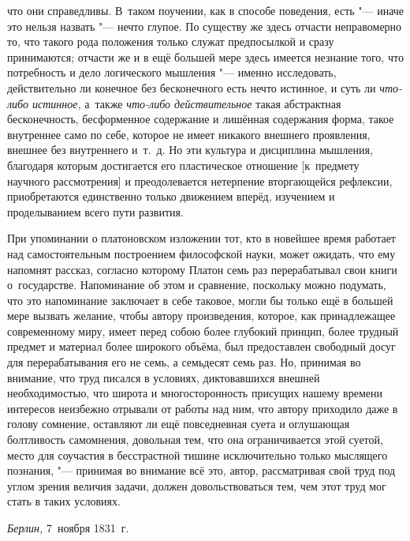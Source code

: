 что они справедливы. В~таком поучении, как в способе поведения, есть
"--- иначе это нельзя назвать "--- нечто глупое. По существу же здесь
отчасти неправомерно то, что такого рода положения только служат предпосылкой
и сразу принимаются; отчасти же и в ещё большей мере здесь имеется
незнание того, что потребность и дело логического мышления "--- именно
исследовать, действительно ли конечное без бесконечного есть нечто
истинное, и суть ли {\em что-либо истинное,} а~также
{\em что-либо действительное} такая абстрактная бесконечность, бесформенное
содержание и лишённая содержания форма, такое внутреннее само по себе, которое не
имеет никакого внешнего проявления, внешнее без внутреннего и~т.~д. Но эти культура и дисциплина
мышления, благодаря которым достигается его пластическое отношение [к~предмету
научного рассмотрения] и преодолевается нетерпение вторгающейся рефлексии,
приобретаются единственно только движением вперёд, изучением и проделыванием
всего пути развития.

При упоминании о платоновском изложении тот, кто в новейшее время работает над
самостоятельным построением философской науки, может ожидать, что ему напомнят
рассказ, согласно которому Платон семь раз перерабатывал свои книги
о~государстве. Напоминание об этом и сравнение, поскольку можно подумать, что
это напоминание заключает в себе таковое, могли бы только ещё в большей мере
вызвать желание, чтобы автору произведения, которое, как принадлежащее
современному миру, имеет перед собою более глубокий принцип, более трудный
предмет и материал более широкого объёма, был предоставлен свободный досуг для
перерабатывания его не семь, а семьдесят семь раз. Но, принимая во внимание,
что труд писался в условиях, диктовавшихся внешней необходимостью, что широта и
многосторонность присущих нашему времени интересов неизбежно отрывали от работы над ним,
что автору приходило даже в голову сомнение, оставляют ли ещё повседневная
суета и оглушающая болтливость самомнения, довольная тем, что она
ограничивается этой суетой, место для соучастия в бесстрастной
тишине исключительно только мыслящего познания, "--- принимая во внимание
всё это, автор, рассматривая свой труд под углом зрения величия задачи, должен
довольствоваться тем, чем этот труд мог стать в таких условиях.

{\em Берлин,} 7~ноября 1831~г.

\bigskip
